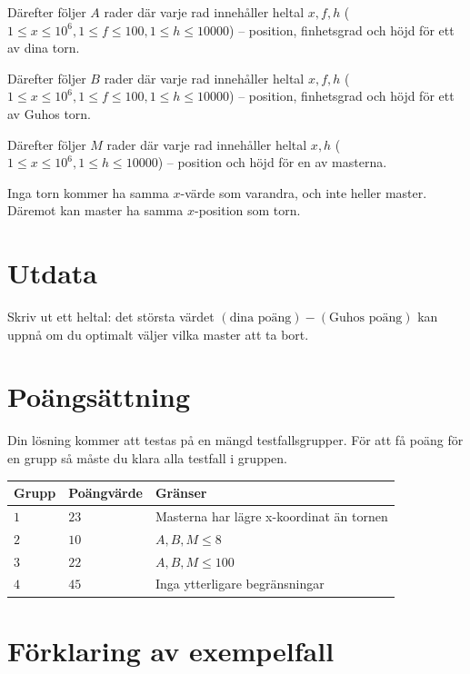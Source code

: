 Därefter följer $A$ rader där varje rad innehåller heltal $x,f,h$ ($1 \leq x \leq 10^6, 1 \le f \le 100, 1\leq h \leq 10000$) -- position, finhetsgrad och höjd för ett av dina torn.

Därefter följer $B$ rader där varje rad innehåller heltal $x,f,h$ ($1 \leq x \leq 10^6, 1 \le f \le 100, 1\leq h \leq 10000$) -- position, finhetsgrad och höjd för ett av Guhos torn.

Därefter följer $M$ rader där varje rad innehåller heltal $x,h$ ($1 \leq x \leq 10^6, 1\leq h \leq 10000$) -- position och höjd för en av masterna.

Inga torn kommer ha samma $x$-värde som varandra, och inte heller master.
Däremot kan master ha samma $x$-position som torn.

\section*{Utdata}
Skriv ut ett heltal: det största värdet $(\text{dina poäng}) - (\text{Guhos poäng})$ kan uppnå om du optimalt väljer vilka master att ta bort.

\section*{Poängsättning}
Din lösning kommer att testas på en mängd testfallsgrupper.
För att få poäng för en grupp så måste du klara alla testfall i gruppen.

\noindent
\begin{tabular}{| l | l | p{12cm} |}
  \hline
  Grupp & Poängvärde & Gränser \\ \hline
  $1$   & $23$       & Masterna har lägre x-koordinat än tornen \\ \hline
  $2$   & $10$       & $A,B,M \leq 8$\\ \hline
  $3$   & $22$       & $A,B,M \leq 100$  \\ \hline
  $4$   & $45$       & Inga ytterligare begränsningar  \\ \hline
\end{tabular}

\section*{Förklaring av exempelfall}

